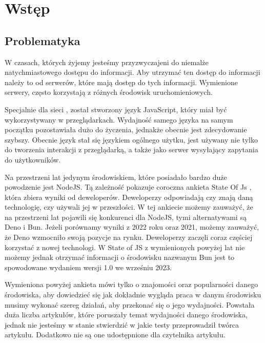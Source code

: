\section*{Wstęp}

\subsection*{Problematyka}
W czasach, których żyjemy jesteśmy przyzwyczajeni do niemalże natychmiastowego dostępu do informacji. Aby utrzymać ten dostęp do informacji należy to od serwerów, które mają dostęp do tych informacji. Wymienione serwery, często korzystają z różnych środowisk uruchomieniowych.

Specjalnie dla sieci , został stworzony język JavaScript, który miał być wykorzystywany w przeglądarkach. Wydajność samego języka na samym początku pozostawiała dużo do życzenia, jednakże obecnie jest zdecydowanie szybszy. Obecnie język stał się językiem ogólnego użytku, jest używany nie tylko do tworzenia interakcji z przeglądarką, a także jako serwer wysyłający zapytania  do użytkowników.

Na przestrzeni lat jedynym środowiskiem, które posiadało bardzo duże powodzenie jest NodeJS. Tą zależność pokazuje coroczna ankieta State Of Js \cite{State_of_js:2021} \cite{State_of_js:2022}, która zbiera wyniki od deweloperów. Deweloperzy odpowiadają czy znają daną technologię, czy używali jej w przeszłości. W tej ankiecie możemy zauważyć, że na przestrzeni lat pojawili się konkurenci dla NodeJS, tymi alternatywami są Deno i Bun. Jeżeli porównamy wyniki z 2022 roku oraz 2021, możemy zauważyć, że Deno wzmocniło swoją pozycje na rynku. Deweloperzy zaczęli coraz częściej korzystać z nowej technologi. W State of JS z wymienionych powyżej lat nie możemy jednak otrzymać informacji o środowisku nazwanym Bun jest to spowodowane wydaniem wersji 1.0 we wrześniu 2023.

Wymieniona powyżej ankieta mówi tylko o znajomości oraz popularności danego środowiska, aby dowiedzieć się jak dokładnie wygląda praca w danym środowisku musimy wykonać szereg działań, aby przekonać się o jego wydajności. Powstała duża liczba artykułów, które poruszały temat wydajności danego środowiska, jednak nie jesteśmy w stanie stwierdzić w jakie testy przeprowadził twórca artykułu. Dodatkowo nie są one udostępnione dla czytelnika artykułu.